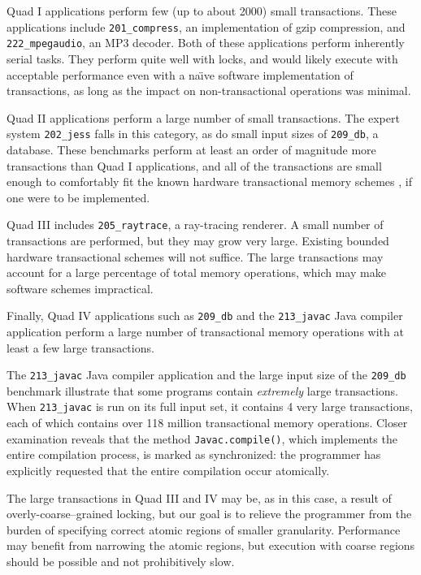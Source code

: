 Quad I applications perform few (up to about 2000) small
transactions.  These applications include \texttt{201\_compress}, an
implementation of gzip compression, and \texttt{222\_mpegaudio}, an
MP3 decoder.  Both of these applications perform inherently serial
tasks.  They perform quite well with locks, and would likely execute
with acceptable performance even with a na\"\i{}ve software
implementation of transactions, as long as the impact on
non-transactional operations was minimal.

Quad II applications perform a large number of small transactions.
The expert system \texttt{202\_jess} falls in this category, as do
small input sizes of \texttt{209\_db}, a database.  These benchmarks
perform at least an order of magnitude more transactions than Quad
I applications, and all of the transactions are small enough to 
comfortably fit the known hardware transactional memory schemes
\cite[etc]{HerlihyMo93}, if
one were to be implemented.

Quad III includes \texttt{205\_raytrace}, a ray-tracing renderer.  A
small number of transactions are performed, but they may grow very
large.  Existing bounded hardware transactional schemes will not
suffice.  The large
transactions may account for a large percentage of total memory
operations, which may make software schemes
impractical.

Finally, Quad IV applications such as \texttt{209\_db} and the
\texttt{213\_javac} Java compiler application perform a large number
of transactional memory operations with at least a few large transactions.  

The \texttt{213\_javac} Java compiler application and the large input
size of the \texttt{209\_db} benchmark illustrate that some programs
contain \emph{extremely} large transactions.  When \texttt{213\_javac}
is run on its full input set, it contains 4 very large transactions,
each of which contains over 118 million transactional memory
operations.  Closer
examination reveals that the method \texttt{Javac.compile()}, which
implements the entire compilation process, is marked as synchronized:
the programmer has explicitly requested that the entire compilation
occur atomically.

The large transactions in Quad III and IV may be, as in this case, a result of
overly-coarse--grained locking, but our goal is to
relieve the programmer from the burden of specifying correct
atomic regions of smaller granularity.  Performance may benefit from
narrowing the atomic regions, but execution with coarse regions should
be possible and not prohibitively slow.

